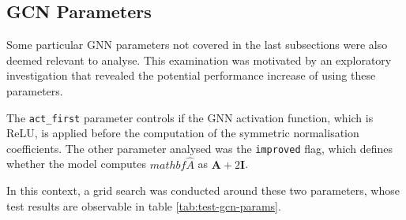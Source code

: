 \subsection{\ac{GCN} Parameters} \label{sec:results-gcn-param}

Some particular \ac{GNN} parameters not covered in the last subsections were also deemed relevant to analyse. This examination was motivated by an exploratory investigation that revealed the potential performance increase of using these parameters. \par
The \texttt{act\_first} parameter controls if the \ac{GNN} activation function, which is ReLU, is applied before the computation of the symmetric normalisation coefficients. The other parameter analysed was the \texttt{improved} flag, which defines whether the model computes $mathbf{\hat{A}}$ as $\mathbf{A} + 2\mathbf{I}$. \par
In this context, a grid search was conducted around these two parameters, whose test results are observable in table \ref{tab:test-gcn-params}.
 

